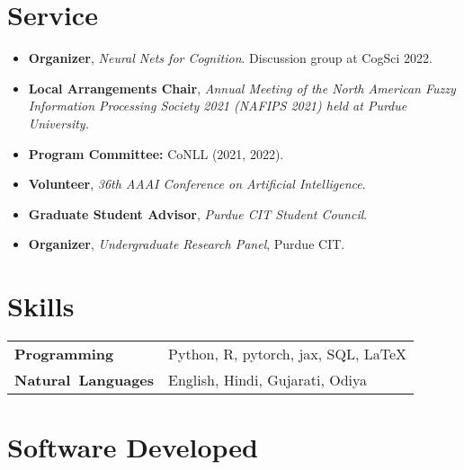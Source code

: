 \documentclass[11pt]{article}
\begin{document}
\section*{Service}
\begin{itemize}
    \item \textbf{Organizer}, \textit{Neural Nets for Cognition}. Discussion group at CogSci 2022.
    \item \textbf{Local Arrangements Chair}, \textit{Annual Meeting of the North American Fuzzy Information Processing Society 2021 (NAFIPS 2021) held at Purdue University.}
    \item \textbf{Program Committee:} CoNLL (2021, 2022).
    \item  \textbf{Volunteer}, \textit{36th AAAI Conference on Artificial Intelligence}.
    \item \textbf{Graduate Student Advisor}, \textit{Purdue CIT Student Council}.
    \item \textbf{Organizer}, \textit{Undergraduate Research Panel}, Purdue CIT.
\end{itemize}

\renewcommand*{\arraystretch}{1}
\section*{Skills}
\vspace{-1em}
\begin{longtable}{p{}  p{} }
    \textbf{Programming} & Python, R, pytorch, jax, SQL, \LaTeX\\
    \textbf{Natural~Languages} & English, Hindi, Gujarati, Odiya
    \end{longtable}
\section*{Software Developed}
\end{document}

